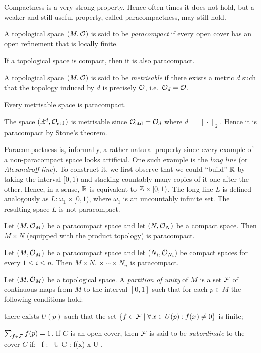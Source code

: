 Compactness is a very strong property. Hence often times it does not hold, but a weaker and still useful property, called paracompactness, may still hold.

\bd
A topological space $(M,\mathcal{O})$ is said to be \emph{paracompact} if every open cover has an open refinement that is locally finite.
\ed

\bc
If a topological space is compact, then it is also paracompact.
\ec

\bd
A topological space $(M,\mathcal{O})$ is said to be \emph{metrisable} if there exists a metric $d$ such that the topology induced by $d$ is precisely $\mathcal{O}$, i.e.\ $\mathcal{O}_d=\mathcal{O}$. 
\ed

\bt[Stone]
Every metrisable space is paracompact.
\et

\be
The space $(\mathbb{R}^d,\mathcal{O}_\mathrm{std})$ is metrisable since $\mathcal{O}_\mathrm{std}=\mathcal{O}_d$ where $d = \|\cdot\|_2$. Hence it is paracompact by Stone's theorem.
\ee

\br
Paracompactness is, informally, a rather natural property since every example of a non-paracompact space looks artificial. One such example is the \emph{long line} (or \emph{Alexandroff line}). To construct it, we first observe that we could ``build'' $\mathbb{R}$ by taking the interval $[0,1)$ and stacking countably many copies of it one after the other. Hence, in a sense, $\mathbb{R}$ is equivalent to $\mathbb{Z} \times [0,1)$. The long line $L$ is defined analogously as $L:\omega_1\times [0,1)$, where $\omega_1$ is an uncountably infinite set. The resulting space $L$ is not paracompact.
\er

\bt
Let $(M,\mathcal{O}_M)$ be a paracompact space and let $(N,\mathcal{O}_N)$ be a compact space. Then $M\times N$ (equipped with the product topology) is paracompact.
\et

\bc
Let $(M,\mathcal{O}_M)$ be a paracompact space and let $(N_i,\mathcal{O}_{N_i})$ be compact spaces for every $1\leq i \leq n$. Then $M\times N_1\times\cdots\times N_n$ is paracompact.
\ec

\bd
Let $(M,\mathcal{O}_M)$ be a topological space. A \emph{partition of unity}  of $M$ is a set $\mathcal{F}$ of continuous maps from $M$ to the interval $[0,1]$ such that for each $p\in M$ the following conditions hold:
\ben
\item[i)] there exists $U(p)$ such that the set $\{f \in \mathcal{F} \mid \forall \, x \in U(p):f(x)\neq 0\}$ is finite;
\item[ii)] $\sum_{f\in \mathcal{F}}f(p)=1$.
\een
If $C$ is an open cover, then $\mathcal{F}$ is said to be \emph{subordinate} to the cover $C$ if:
\bse
\forall \, f \in \cF : \exists \, U \in C : f(x)  \imp x \in U .
\ese
\ed

